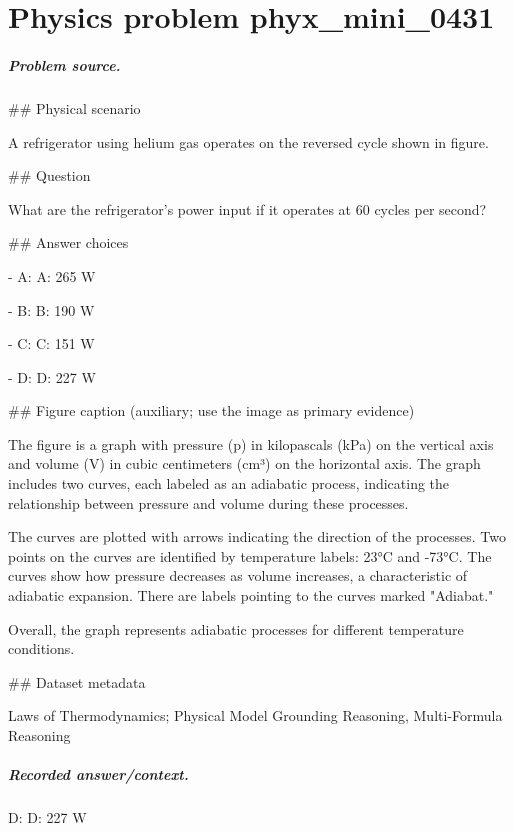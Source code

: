 
\chapter{Physics problem phyx\_mini\_0431}
\label{ch:PhyXMiniProblems_problem_phyx_mini_0431}

\paragraph{Problem source.}
\#\# Physical scenario

A refrigerator using helium gas operates on the reversed cycle shown in figure.

\#\# Question

What are the refrigerator's power input if it operates at 60 cycles per second?

\#\# Answer choices

- A: A: 265 W

- B: B: 190 W

- C: C: 151 W

- D: D: 227 W

\#\# Figure caption (auxiliary; use the image as primary evidence)

The figure is a graph with pressure (p) in kilopascals (kPa) on the vertical axis and volume (V) in cubic centimeters (cm³) on the horizontal axis. The graph includes two curves, each labeled as an adiabatic process, indicating the relationship between pressure and volume during these processes.

The curves are plotted with arrows indicating the direction of the processes. Two points on the curves are identified by temperature labels: 23°C and -73°C. The curves show how pressure decreases as volume increases, a characteristic of adiabatic expansion. There are labels pointing to the curves marked "Adiabat."

Overall, the graph represents adiabatic processes for different temperature conditions.

\#\# Dataset metadata

Laws of Thermodynamics; Physical Model Grounding Reasoning, Multi-Formula Reasoning

\paragraph{Recorded answer/context.}
D: D: 227 W

